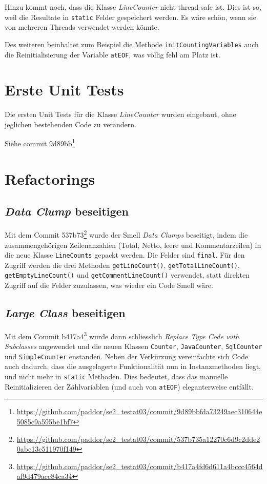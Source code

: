 \documentclass[a4paper]{article}
\newcommand{\java}[1]{\lstinline[style=customjava]{#1}} %
\begin{document}
Hinzu kommt noch, dass die Klasse \emph{LineCounter} nicht thread-safe ist.
Dies ist so, weil die Resultate in \java{static} Felder gespeichert werden. Es
w\"are sch\"on, wenn sie von mehreren Threads verwendet werden k\"onnte.

Des weiteren beinhaltet zum Beispiel die Methode \java{initCountingVariables}
auch die Reinitialisierung der Variable \java{atEOF}, was v\"ollig fehl am
Platz ist.

\section{Erste Unit Tests}
Die ersten Unit Tests f\"ur die Klasse \emph{LineCounter} wurden eingebaut, ohne jeglichen bestehenden Code zu ver\"andern.

Siehe commit 9d89bb\footnote{\url{https://github.com/paddor/se2_testat03/commit/9d89bbfda73249aec310644e5085c9a595be1bf7}}

\section{Refactorings}

\subsection{\emph{Data Clump} beseitigen}
Mit dem Commit
537b73\footnote{\url{https://github.com/paddor/se2_testat03/commit/537b735a12270c6d9c2dde20abc13e511970f149}}
wurde der Smell \emph{Data Clumps} beseitigt, indem die zusammengeh\"origen
Zeilenanzahlen (Total, Netto, leere und Kommentarzeilen) in die neue Klasse
\java{LineCounts} gepackt werden. Die Felder sind \java{final}. F\"ur den
Zugriff werden die drei Methoden \java{getLineCount()},
\java{getTotalLineCount()}, \java{getEmptyLineCount()} und
\java{getCommentLineCount()} verwendet, statt direkten Zugriff auf die Felder
zuzulassen, was wieder ein Code Smell w\"are.

\subsection{\emph{Large Class} beseitigen}
Mit dem Commit
b417a4\footnote{\url{https://github.com/paddor/se2_testat03/commit/b417a4fd6d611a4bccc4564daf9d479acc84ca34}}
wurde dann schliesslich \emph{Replace Type Code with Subclasses} angewendet und
die neuen Klassen \java{Counter}, \java{JavaCounter}, \java{SqlCounter} und
\java{SimpleCounter} enstanden. Neben der Verk\"urzung vereinfachte sich Code
auch dadurch, dass die ausgelagerte Funktionalit\"at nun in Instanzmethoden
liegt, und nicht mehr in \java{static} Methoden. Dies bedeutet, dass das
manuelle Reinitializieren der Z\"ahlvariablen (und auch von \java{atEOF})
eleganterweise entf\"allt.
\end{document}
